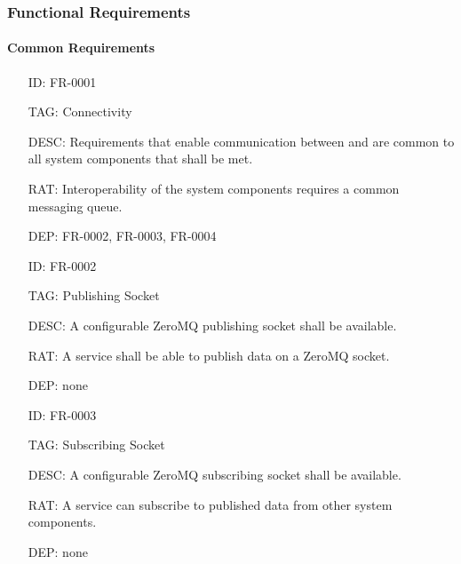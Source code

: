     \subsubsection{Functional Requirements}\label{sec:req-srs-func}

      \paragraph{Common Requirements}

        \begin{itemize}
          \setlength{\itemindent}{.5in}
          \itemsep .15em
          \item[ID:] FR-0001
          \item[TAG:] Connectivity
          \item[DESC:] Requirements that enable communication between and are
            common to all system components that shall be met.
          \item[RAT:] Interoperability of the system components requires a
            common messaging queue.
          \item[DEP:] FR-0002, FR-0003, FR-0004
        \end{itemize}

        \begin{itemize}
          \setlength{\itemindent}{.5in}
          \itemsep .15em
          \item[ID:] FR-0002
          \item[TAG:] Publishing Socket
          \item[DESC:] A configurable ZeroMQ publishing socket shall be
            available.
          \item[RAT:] A service shall be able to publish data on a ZeroMQ
            socket.
          \item[DEP:] none
        \end{itemize}

        \begin{itemize}
          \setlength{\itemindent}{.5in}
          \itemsep .15em
          \item[ID:] FR-0003
          \item[TAG:] Subscribing Socket
          \item[DESC:] A configurable ZeroMQ subscribing socket shall be
            available.
          \item[RAT:] A service can subscribe to published data from other
            system components.
          \item[DEP:] none
        \end{itemize}

